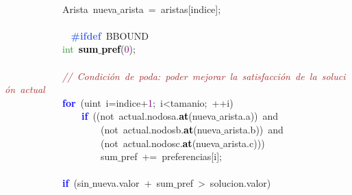 \mbox{} \\
\mbox{}\ \ \ \ \ \ \ \ \ \ \ \ \textcolor{TealBlue}{Arista}\ nueva$\_$arista\ \textcolor{BrickRed}{=}\ aristas\textcolor{BrickRed}{[}indice\textcolor{BrickRed}{];} \\
\mbox{} \\
\mbox{}\textbf{\textcolor{RoyalBlue}{\ \ \ \ \ \ \ \ \ \ \ \ \#ifdef}}\ BBOUND \\
\mbox{}\ \ \ \ \ \ \ \ \ \ \ \ \textcolor{ForestGreen}{int}\ \textbf{\textcolor{Black}{sum$\_$pref}}\textcolor{BrickRed}{(}\textcolor{Purple}{0}\textcolor{BrickRed}{);} \\
\mbox{} \\
\mbox{}\ \ \ \ \ \ \ \ \ \ \ \ \textit{\textcolor{Brown}{//\ Condición\ de\ poda:\ poder\ mejorar\ la\ satisfacción\ de\ la\ solución\ actual}} \\
\mbox{}\ \ \ \ \ \ \ \ \ \ \ \ \textbf{\textcolor{Blue}{for}}\ \textcolor{BrickRed}{(}\textcolor{TealBlue}{uint}\ i\textcolor{BrickRed}{=}indice\textcolor{BrickRed}{+}\textcolor{Purple}{1}\textcolor{BrickRed}{;}\ i\textcolor{BrickRed}{\textless{}}tamanio\textcolor{BrickRed}{;}\ \textcolor{BrickRed}{++}i\textcolor{BrickRed}{)} \\
\mbox{}\ \ \ \ \ \ \ \ \ \ \ \ \ \ \ \ \textbf{\textcolor{Blue}{if}}\ \textcolor{BrickRed}{((}\textcolor{TealBlue}{not}\ actual\textcolor{BrickRed}{.}nodosa\textcolor{BrickRed}{.}\textbf{\textcolor{Black}{at}}\textcolor{BrickRed}{(}nueva$\_$arista\textcolor{BrickRed}{.}a\textcolor{BrickRed}{))}\ and \\
\mbox{}\ \ \ \ \ \ \ \ \ \ \ \ \ \ \ \ \ \ \ \ \textcolor{BrickRed}{(}\textcolor{TealBlue}{not}\ actual\textcolor{BrickRed}{.}nodosb\textcolor{BrickRed}{.}\textbf{\textcolor{Black}{at}}\textcolor{BrickRed}{(}nueva$\_$arista\textcolor{BrickRed}{.}b\textcolor{BrickRed}{))}\ and \\
\mbox{}\ \ \ \ \ \ \ \ \ \ \ \ \ \ \ \ \ \ \ \ \textcolor{BrickRed}{(}\textcolor{TealBlue}{not}\ actual\textcolor{BrickRed}{.}nodosc\textcolor{BrickRed}{.}\textbf{\textcolor{Black}{at}}\textcolor{BrickRed}{(}nueva$\_$arista\textcolor{BrickRed}{.}c\textcolor{BrickRed}{)))} \\
\mbox{}\ \ \ \ \ \ \ \ \ \ \ \ \ \ \ \ \ \ \ \ sum$\_$pref\ \textcolor{BrickRed}{+=}\ preferencias\textcolor{BrickRed}{[}i\textcolor{BrickRed}{];} \\
\mbox{} \\
\mbox{}\ \ \ \ \ \ \ \ \ \ \ \ \textbf{\textcolor{Blue}{if}}\ \textcolor{BrickRed}{(}sin$\_$nueva\textcolor{BrickRed}{.}valor\ \textcolor{BrickRed}{+}\ sum$\_$pref\ \textcolor{BrickRed}{\textgreater{}}\ solucion\textcolor{BrickRed}{.}valor\textcolor{BrickRed}{)} \\
